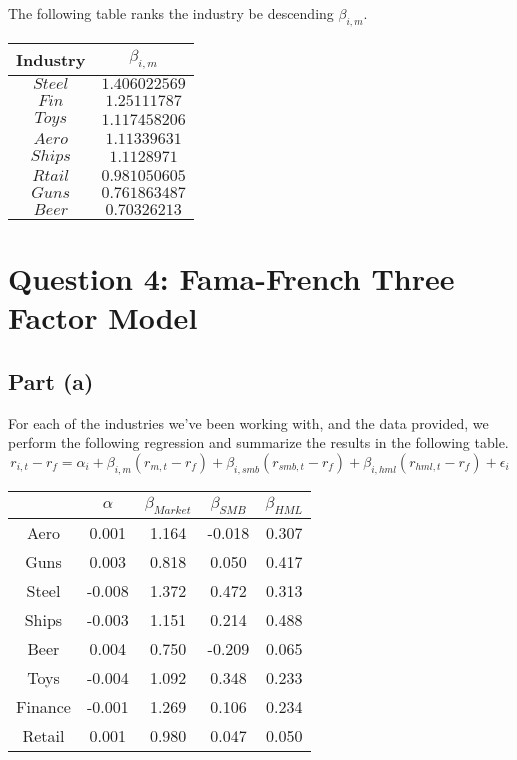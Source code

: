 \documentclass[12pt]{article}
\begin{document}
		The following table ranks the industry be descending $\beta_{i,m}$. 
		\begin{center}
 		\begin{tabular}{||c c||} 
 		\hline
 		 Industry &  $\beta_{i,m}$ \\ [0.5ex] 
 		\hline \hline
 		$Steel$ & $1.406022569$  \\ 
 		\hline
 		$Fin$ & $1.25111787$ \\
 		\hline
 		$Toys$ & $1.117458206$  \\
 		\hline
 		$Aero$ & $1.11339631$  \\
 		\hline
 		$Ships$ & $1.1128971$  \\
 		\hline
 		$Rtail$ & $0.981050605$ \\
 		\hline
 		$Guns$ & $0.761863487$ \\
 		\hline
 		$Beer$ & $0.70326213$ \\ 
 		\hline
		\end{tabular}
		\end{center}
	
	
\section{Question 4: Fama-French Three Factor Model}

	\subsection{Part (a)}
	
		For each of the industries we've been working with, and the data provided, we perform the following regression and summarize the results
		in the following table. 
		$$ r_{i,t} - r_{f} = \alpha_{i} + \beta_{i,m}(r_{m,t} - r_{f}) + \beta_{i,smb}(r_{smb,t} - r_{f}) + \beta_{i,hml}(r_{hml,t} - r_{f}) + \epsilon_{i} $$			
		\begin{table}[H]
 		 \centering
  		  \begin{tabular}{c|cccc}
   		       & $\alpha$ & $\beta_{Market}$ & $\beta_{SMB}$ & $\beta_{HML}$ \\
  		 		 \midrule
  		  		Aero  & 0.001 & 1.164 & -0.018 & 0.307 \\
    			Guns  & 0.003 & 0.818 & 0.050 & 0.417 \\
    			Steel & -0.008 & 1.372 & 0.472 & 0.313 \\
    			Ships & -0.003 & 1.151 & 0.214 & 0.488 \\
    			Beer  & 0.004 & 0.750 & -0.209 & 0.065 \\
    			Toys  & -0.004 & 1.092 & 0.348 & 0.233 \\
    			Finance & -0.001 & 1.269 & 0.106 & 0.234 \\
  		   	    Retail & 0.001 & 0.980 & 0.047 & 0.050 \\
  			  \end{tabular}%
 			\label{tab:addlabel}%
			\end{table}%
\end{document}
